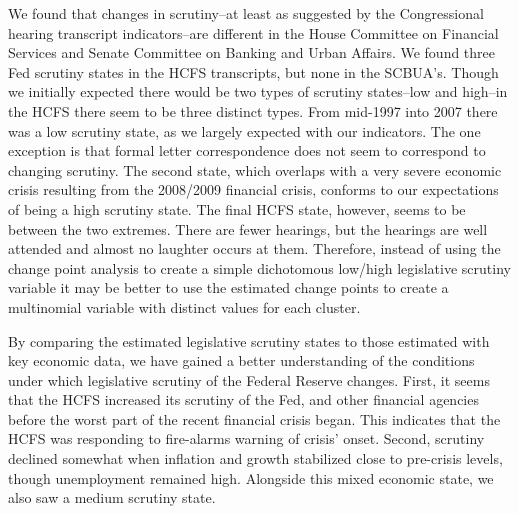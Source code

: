 \documentclass[a4paper]{article}\usepackage[]{graphicx}\usepackage[]{color}
\begin{document}
We found that changes in scrutiny--at least as suggested by the Congressional hearing transcript indicators--are different in the House Committee on Financial Services and Senate Committee on Banking and Urban Affairs. We found three Fed scrutiny states in the HCFS transcripts, but none in the SCBUA's. Though we initially expected there would be two types of scrutiny states--low and high--in the HCFS there seem to be three distinct types. From mid-1997 into 2007 there was a low scrutiny state, as we largely expected with our indicators. The one exception is that formal letter correspondence does not seem to correspond to changing scrutiny. The second state, which overlaps with a very severe economic crisis resulting from the 2008/2009 financial crisis, conforms to our expectations of being a high scrutiny state. The final HCFS state, however, seems to be between the two extremes. There are fewer hearings, but the hearings are well attended and almost no laughter occurs at them. Therefore, instead of using the change point analysis to create a simple dichotomous low/high legislative scrutiny variable it may be better to use the estimated change points to create a multinomial variable with distinct values for each cluster.

By comparing the estimated legislative scrutiny states to those estimated with key economic data, we have gained a better understanding of the conditions under which legislative scrutiny of the Federal Reserve changes. First, it seems that the HCFS increased its scrutiny of the Fed, and other financial agencies before the worst part of the recent financial crisis began. This indicates that the HCFS was responding to fire-alarms warning of crisis' onset. Second, scrutiny declined somewhat when inflation and growth stabilized close to pre-crisis levels, though unemployment remained high. Alongside this mixed economic state, we also saw a medium scrutiny state.




\end{document}
